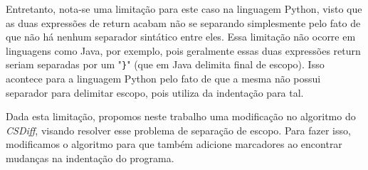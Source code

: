 Entretanto, nota-se uma limitação para este caso na linguagem Python, visto que as duas expressões de return acabam não
se separando simplesmente pelo fato de que não há nenhum separador sintático entre eles.
Essa limitação não ocorre em linguagens
como Java, por exemplo, pois geralmente essas duas expressões return seriam separadas por um "\verb|}|"
(que em Java delimita final de escopo). Isso acontece
para a linguagem Python pelo fato de que a mesma não possui separador para delimitar escopo, pois utiliza da indentação para tal.

Dada esta limitação, propomos neste trabalho uma modificação no algoritmo do \emph{CSDiff}, visando resolver esse problema de
separação de escopo. Para fazer isso, modificamos o algoritmo para que também adicione marcadores ao encontrar mudanças na
indentação do programa.



